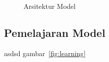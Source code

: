 \begin{figure}[htbp]
    \begin{center}
    \end{center}
    \vspace{-20pt}
    \captionsetup{labelfont=bf, textfont=bf}
    \caption{Arsitektur Model}
    \vspace{-10pt}
    \captionsetup{labelfont=md, textfont=md}
    \label{fig:arsitektur}
\end{figure}

\subsection{Pemelajaran Model}
asdsd
gambar~\ref{fig:learning}

